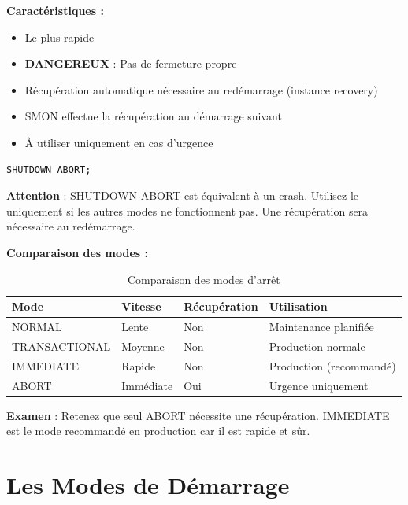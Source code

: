 \documentclass[11pt,a4paper]{article}
\begin{document}
\textbf{Caractéristiques :}
\begin{itemize}
    \item Le plus rapide
    \item \textbf{DANGEREUX} : Pas de fermeture propre
    \item Récupération automatique nécessaire au redémarrage (instance recovery)
    \item SMON effectue la récupération au démarrage suivant
    \item À utiliser uniquement en cas d'urgence
\end{itemize}

\begin{commandebox}
\begin{lstlisting}
SHUTDOWN ABORT;
\end{lstlisting}
\end{commandebox}

\begin{dangerbox}
\textbf{Attention} : SHUTDOWN ABORT est équivalent à un crash. Utilisez-le uniquement si les autres modes ne fonctionnent pas. Une récupération sera nécessaire au redémarrage.
\end{dangerbox}

\textbf{Comparaison des modes :}

\begin{table}[h]
\centering
\begin{tabular}{|l|l|l|l|}
\hline
\textbf{Mode} & \textbf{Vitesse} & \textbf{Récupération} & \textbf{Utilisation} \\
\hline
NORMAL & Lente & Non & Maintenance planifiée \\
TRANSACTIONAL & Moyenne & Non & Production normale \\
IMMEDIATE & Rapide & Non & Production (recommandé) \\
ABORT & Immédiate & Oui & Urgence uniquement \\
\hline
\end{tabular}
\caption{Comparaison des modes d'arrêt}
\end{table}

\begin{tipbox}
\textbf{Examen} : Retenez que seul ABORT nécessite une récupération. IMMEDIATE est le mode recommandé en production car il est rapide et sûr.
\end{tipbox}

\section{Les Modes de Démarrage}
\end{document}

